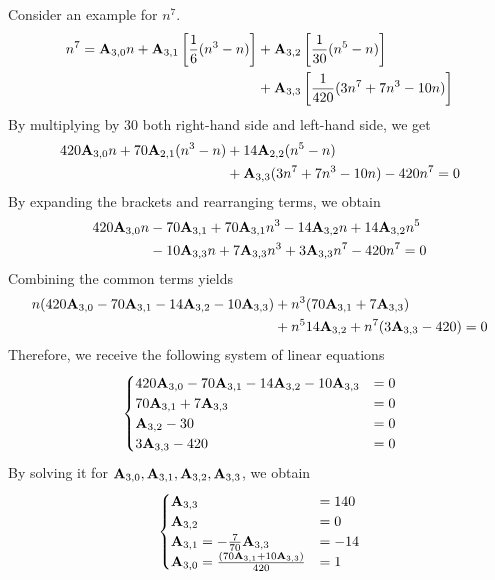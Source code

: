 Consider an example for $n^7$.
\begin{align*}
    n^7 =
    {\mathbf{A}} \sb{3,0} n
    + {\mathbf{A}} \sb{3,1} \left[ \frac{1}{6} (n^3-n) \right]
    &+ {\mathbf{A}} \sb{3,2} \left[ \frac{1}{30} (n^5-n) \right] \\
    &+ {\mathbf{A}} \sb{3,3} \left[ \frac{1}{420} (3n^7+7n^3-10n) \right]
\end{align*}
By multiplying by $30$ both right-hand side and left-hand side, we get
\begin{align*}
    420 {\mathbf{A}} \sb{3,0} n + 70 {\mathbf{A}} \sb{2,1} (n^3-n)
    &+ 14 {\mathbf{A}} \sb{2,2} (n^5-n) \\
    &+ {\mathbf{A}} \sb{3,3} (3n^7+7n^3-10n) - 420n^7 = 0
\end{align*}
By expanding the brackets and rearranging terms, we obtain
\begin{align*}
    420 {\mathbf{A}} \sb{3,0} n
    &- 70 {\mathbf{A}} \sb{3,1} + 70 {\mathbf{A}} \sb{3,1} n^3 - 14 {\mathbf{A}} \sb{3,2} n + 14 {\mathbf{A}} \sb{3,2} n^5 \\
    &- 10 {\mathbf{A}} \sb{3,3} n + 7 {\mathbf{A}} \sb{3,3} n^3 + 3 {\mathbf{A}} \sb{3,3} n^7 - 420n^7 = 0
\end{align*}
Combining the common terms yields
\begin{align*}
    n (420 {\mathbf{A}} \sb{3,0} - 70 {\mathbf{A}} \sb{3,1} - 14 {\mathbf{A}} \sb{3,2} - 10 {\mathbf{A}} \sb{3,3})
    &+ n^3 (70 {\mathbf{A}} \sb{3,1} + 7 {\mathbf{A}} \sb{3,3}) \\
    &+ n^5 14 {\mathbf{A}} \sb{3,2}
    + n^7 (3 {\mathbf{A}} \sb{3,3} - 420)
    = 0
\end{align*}
Therefore, we receive the following system of linear equations
\begin{align*}
    \begin{cases}
        420 {\mathbf{A}} \sb{3,0} - 70 {\mathbf{A}} \sb{3,1} - 14 {\mathbf{A}} \sb{3,2} - 10 {\mathbf{A}} \sb{3,3} &= 0 \\
        70 {\mathbf{A}} \sb{3,1} + 7 {\mathbf{A}} \sb{3,3} &= 0 \\
        {\mathbf{A}} \sb{3,2} - 30 &= 0 \\
        3 {\mathbf{A}} \sb{3,3} - 420 &= 0
    \end{cases}
\end{align*}
By solving it for ${\mathbf{A}} \sb{3,0}, {\mathbf{A}} \sb{3,1}, {\mathbf{A}} \sb{3,2}, {\mathbf{A}} \sb{3,3}$, we obtain
\begin{equation*}
    \begin{cases}
        {\mathbf{A}} \sb{3,3} &= 140 \\
        {\mathbf{A}} \sb{3,2} &= 0 \\
        {\mathbf{A}} \sb{3,1} = -\frac{7}{70} {\mathbf{A}} \sb{3,3} &= -14 \\
        {\mathbf{A}} \sb{3,0} = \frac{(70 {\mathbf{A}} \sb{3,1} + 10 {\mathbf{A}} \sb{3,3})}{420} &= 1
    \end{cases}
\end{equation*}
